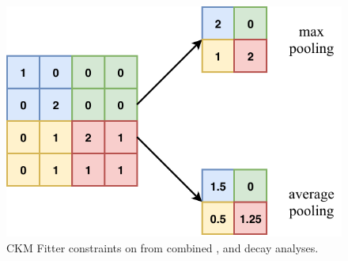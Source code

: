 \begin{figure}
    \includegraphics[width=\largefigwidth]{diagrams/6-cvn/pooling.pdf}
    \caption[CKM Fitter constraints on \alphaCKM.]%
    {CKM Fitter constraints on \alphaCKM from combined \BToPiPi,
        \BToRhoPi and \BToRhoRho decay analyses.}
    \label{fig:pooling}
\end{figure}

